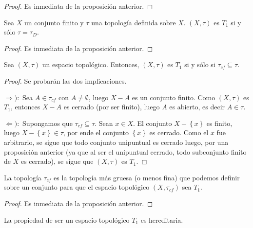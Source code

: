 \documentclass[12pt]{report}
\theoremstyle{largebreak}
\begin{document}
    \begin{proof}
        Es inmediata de la proposición anterior.
    \end{proof}

    \begin{cor}
        Sea $X$ un conjunto finito y $\tau$ una topología definida sobre $X$. $(X,\tau)$ es $T_1$ si y sólo $\tau=\tau_D$.
    \end{cor}

    \begin{proof}
        Es inmediata de la proposición anterior.
    \end{proof}

    \begin{propo}
        Sea $(X,\tau)$ un espacio topológico. Entonces, $(X,\tau)$ es $T_1$ si y sólo si $\tau_{cf}\subseteq\tau$.
    \end{propo}

    \begin{proof}
        Se probarán las dos implicaciones.

        $\Rightarrow):$ Sea $A\in\tau_{cf}$ con $A\neq\emptyset$, luego $X-A$ es un conjunto finito. Como $(X,\tau)$ es $T_1$, entonces $X-A$ es cerrado (por ser finito), luego $A$ es abierto, es decir $A\in\tau$.
        
        $\Leftarrow):$ Supongamos que $\tau_{cf}\subseteq\tau$. Sean $x\in X$. El conjunto $X-\left\{x\right\}$ es finito, luego $X-\left\{x\right\}\in\tau$, por ende el conjunto $\left\{x\right\}$ es cerrado. Como el $x$ fue arbitrario, se sigue que todo conjunto unipuntual es cerrado luego, por una proposición anterior (ya que al ser el unipuntual cerrado, todo subconjunto finito de $X$ es cerrado), se sigue que $(X,\tau)$ es $T_1$.
    \end{proof}

    \begin{cor}
        La topología $\tau_{cf}$ es la topología más gruesa (o menos fina) que podemos definir sobre un conjunto para que el espacio topológico $(X,\tau_{cf})$ sea $T_1$.
    \end{cor}

    \begin{proof}
        Es inmediata de la proposición anterior.
    \end{proof}

    \begin{propo}
        La propiedad de ser un espacio topológico $T_1$ es hereditaria. 
    \end{propo}
\end{document}
